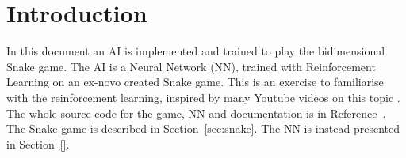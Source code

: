 \section{Introduction}
\label{sec:intro}

In this document an AI is implemented and trained to play the bidimensional Snake game. The AI is a Neural Network (NN), trained with Reinforcement Learning on an ex-novo created Snake game. This is an exercise to familiarise with the reinforcement learning, inspired by many Youtube videos on this topic \cite{SNAKE1,SNAKE2,SNAKE3,SNAKE4,SNAKE5,SNAKE6}. The whole source code for the game, NN and documentation is in Reference~\cite{MyGITHUB}. \\

The Snake game is described in Section~\ref{sec:snake}. The NN is instead presented in Section~\ref{}.